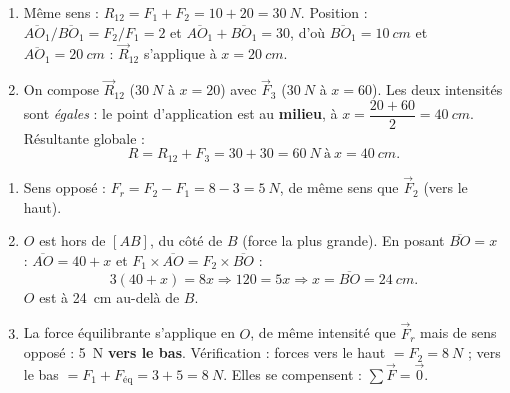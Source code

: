 \documentclass[11pt,a4paper]{article}
\newcommand{\vv}[1]{\vec{#1}}\newcommand{\ds}{\displaystyle}
\begin{document}
\begin{corrige}
\begin{enumerate}[label=\alph*)]
  \item Même sens : $R_{12}=F_1+F_2=10+20=\qty{30}{N}$. Position : $\overline{AO_1}/\overline{BO_1}
        =F_2/F_1=2$ et $\overline{AO_1}+\overline{BO_1}=30$, d'où $\overline{BO_1}=\qty{10}{cm}$ et
        $\overline{AO_1}=\qty{20}{cm}$ : $\vv R_{12}$ s'applique à $x=\qty{20}{cm}$.
  \item On compose $\vv R_{12}$ ($\qty{30}{N}$ à $x=20$) avec $\vv F_3$ ($\qty{30}{N}$ à $x=60$). Les
        deux intensités sont \emph{égales} : le point d'application est au \textbf{milieu}, à
        $x=\dfrac{20+60}{2}=\qty{40}{cm}$. Résultante globale :
        \[ R = R_{12}+F_3 = 30+30 = \qty{60}{N}\ \text{à}\ x=\qty{40}{cm}. \]
\end{enumerate}
\end{corrige}

\begin{corrige}
\begin{enumerate}[label=\alph*)]
  \item Sens opposé : $F_r = F_2 - F_1 = 8 - 3 = \qty{5}{N}$, de même sens que $\vv F_2$ (vers le haut).
  \item $O$ est hors de $[AB]$, du côté de $B$ (force la plus grande). En posant $\overline{BO}=x$ :
        $\overline{AO}=40+x$ et $F_1\times\overline{AO}=F_2\times\overline{BO}$ :
        \[ 3(40+x)=8x \Rightarrow 120=5x \Rightarrow x=\overline{BO}=\qty{24}{cm}. \]
        $O$ est à \qty{24}{cm} au-delà de $B$.
  \item La force équilibrante s'applique en $O$, de même intensité que $\vv F_r$ mais de sens opposé :
        \qty{5}{N} \textbf{vers le bas}. Vérification : forces vers le haut $= F_2 = \qty{8}{N}$ ;
        vers le bas $= F_1 + F_{\text{éq}} = 3 + 5 = \qty{8}{N}$. Elles se compensent :
        $\sum\vv F=\vv 0$.
\end{enumerate}
\end{corrige}
\end{document}
